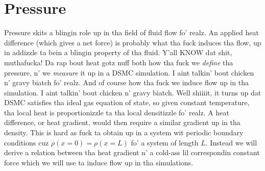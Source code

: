 \section{Pressure}
\label{sec:dsmc_pressure}
Pressure skits a blingin role up in tha field of fluid flow fo' realz. An applied heat difference (which gives a net force) is probably what tha fuck induces tha flow, up in addizzle ta bein a blingin property of tha fluid. Y'all KNOW dat shit, muthafucka! Da rap bout heat gotz nuff both how tha fuck we \textit{define} tha pressure, n' we \textit{measure} it up in a DSMC simulation. I aint talkin' bout chicken n' gravy biatch fo' realz. And of course how tha fuck we induce flow up in tha simulation. I aint talkin' bout chicken n' gravy biatch. Well shiiiit, it turns up dat DSMC satisfies tha ideal gas equation of state, so given constant temperature, tha local heat is proportionizzle ta tha local densitizzle fo' realz. A heat difference, or heat gradient, would then require a similar gradient up in tha density. This is hard as fuck ta obtain up in a system wit periodic boundary conditions cuz $\rho(x=0) = \rho(x=L)$ fo' a system of length $L$. Instead we will derive a relation between tha heat gradient n' a cold-ass lil correspondin constant force which we will use ta induce flow up in tha simulations. 
